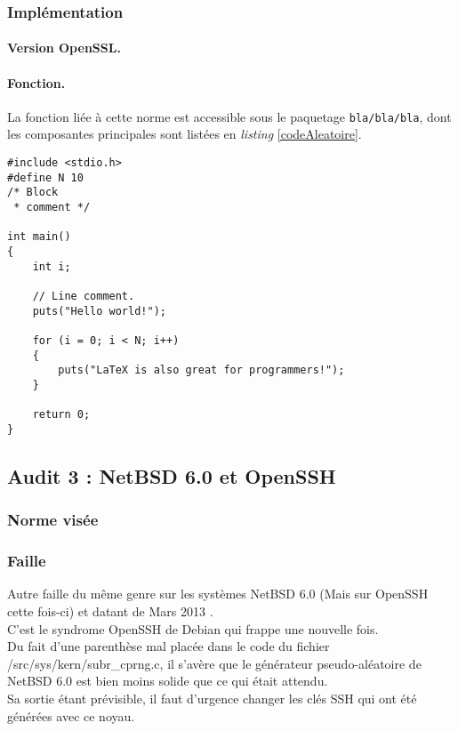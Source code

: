 	\subsubsection{Implémentation}
		
		\paragraph{Version OpenSSL.\\}
		
		\paragraph{Fonction.\\}
		La fonction liée à cette norme est accessible sous le paquetage \texttt{bla/bla/bla}, dont les composantes principales sont listées en \textit{listing} \ref{codeAleatoire}.
		
		
		\begin{lstlisting}[style=customc,caption=codeAleatoire.c, label=codeAleatoire]
#include <stdio.h>
#define N 10
/* Block
 * comment */
 
int main()
{
    int i;
 
    // Line comment.
    puts("Hello world!");
 
    for (i = 0; i < N; i++)
    {
        puts("LaTeX is also great for programmers!");
    }
 
    return 0;
}
		\end{lstlisting}
		
	\subsection{Audit 3 : NetBSD 6.0 et OpenSSH}
		\subsubsection{Norme visée}
		\subsubsection{Faille}
		
			Autre faille du même genre sur les systèmes NetBSD 6.0 
			(Mais sur OpenSSH cette fois-ci) et datant de Mars 2013
			\cite{alerteBSD2013} \cite{failleNetBSDPatrick}. \\
		
			C'est le syndrome OpenSSH de Debian qui frappe une nouvelle fois.\\
			Du fait d'une parenthèse mal placée dans le code du fichier 
			/src/sys/kern/subr\_cprng.c, il s'avère que le générateur 
			pseudo-aléatoire de NetBSD 6.0 est bien moins solide que ce 
			qui était attendu.\\
			Sa sortie étant prévisible, il faut d'urgence changer les clés 
			SSH qui ont été générées avec ce noyau.\\
		
